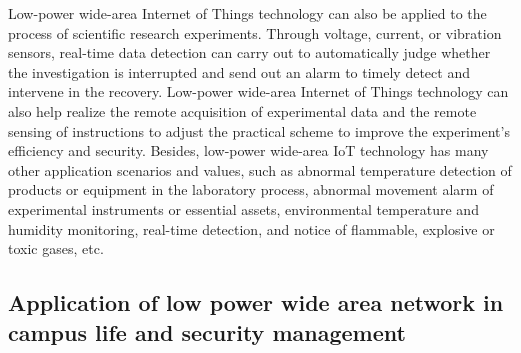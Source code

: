 \documentclass[conference]{IEEEtran}
\begin{document}
Low-power wide-area Internet of Things technology can also be applied to the process of scientific research experiments. Through voltage, current, or vibration sensors, real-time data detection can carry out to automatically judge whether the investigation is interrupted and send out an alarm to timely detect and intervene in the recovery. Low-power wide-area Internet of Things technology can also help realize the remote acquisition of experimental data and the remote sensing of instructions to adjust the practical scheme to improve the experiment's efficiency and security. Besides, low-power wide-area IoT technology has many other application scenarios and values, such as abnormal temperature detection of products or equipment in the laboratory process, abnormal movement alarm of experimental instruments or essential assets, environmental temperature and humidity monitoring, real-time detection, and notice of flammable, explosive or toxic gases, etc.\cite{INTCAMPUS:BriefAnalysis}


\subsection{Application of low power wide area network in campus life and security management}
\end{document}

